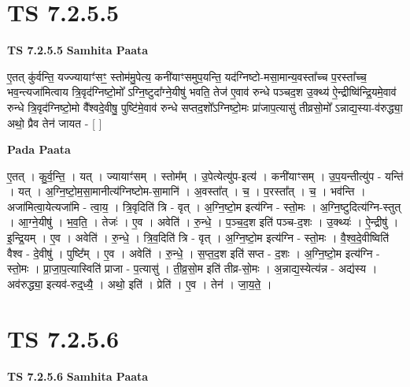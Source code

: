 \documentclass[17pt]{extarticle}
\begin{document}

\section{ TS 7.2.5.5 }

\textbf{TS 7.2.5.5 } \newline
\textbf{Samhita Paata} \newline

ए॒तत् कु॑र्वन्ति॒ यज्ज्यायाꣳ॑सꣳ॒॒ स्तोम॑मु॒पेत्य॒ कनी॑याꣳसमुप॒यन्ति॒ यद॑ग्निष्टो-मसा॒मान्य॒वस्ता᳚च्च प॒रस्ता᳚च्च॒ भव॒न्त्यजा॑मित्वाय त्रि॒वृद॑ग्निष्टो॒मो᳚ ऽग्नि॒ष्टुदा᳚ग्ने॒यीषु॑ भवति॒ तेज॑ ए॒वाव॑ रुन्धे पञ्चद॒श उ॒क्थ्य॑ ऐ॒न्द्रीष्वि॑न्द्रि॒यमे॒वाव॑ रुन्धे त्रि॒वृद॑ग्निष्टो॒मो वै᳚श्वदे॒वीषु॒ पुष्टि॑मे॒वाव॑ रुन्धे सप्तद॒शो᳚ऽग्निष्टो॒मः प्रा॑जाप॒त्यासु॑ तीव्रसो॒मो᳚ ऽन्नाद्य॒स्या-व॑रुद्ध्या॒ अथो॒ प्रैव तेन॑ जायत - [  ] \newline

\textbf{Pada Paata} \newline

ए॒तत् । कु॒र्व॒न्ति॒ । यत् । ज्यायाꣳ॑सम् । स्तोम᳚म् । उ॒पेत्येत्यु॑प-इत्य॑ । कनी॑याꣳसम् । उ॒प॒यन्तीत्यु॑प - यन्ति॑ । यत् । अ॒ग्नि॒ष्टो॒म॒सा॒मानीत्य॑ग्निष्टोम-सा॒मानि॑ । अ॒वस्ता᳚त् । च॒ । प॒रस्ता᳚त् । च॒ । भव॑न्ति । अजा॑मित्वा॒येत्यजा॑मि - त्वा॒य॒ । त्रि॒वृदिति॑ त्रि - वृत् । अ॒ग्नि॒ष्टो॒म इत्य॑ग्नि - स्तो॒मः । अ॒ग्नि॒ष्टुदित्य॑ग्नि-स्तुत् । आ॒ग्ने॒यीषु॑ । भ॒व॒ति॒ । तेजः॑ । ए॒व । अवेति॑ । रु॒न्धे॒ । प॒ञ्च॒द॒श इति॑ पञ्च-द॒शः । उ॒क्थ्यः॑ । ऐ॒न्द्रीषु॑ । इ॒न्द्रि॒यम् । ए॒व । अवेति॑ । रु॒न्धे॒ । त्रि॒व॒दिति॑ त्रि - वृत् । अ॒ग्नि॒ष्टो॒म इत्य॑ग्नि - स्तो॒मः । वै॒श्व॒दे॒वीष्विति॑ वैश्व - दे॒वीषु॑ । पुष्टि᳚म् । ए॒व । अवेति॑ । रु॒न्धे॒ । स॒प्त॒द॒श इति॑ सप्त - द॒शः । अ॒ग्नि॒ष्टो॒म इत्य॑ग्नि - स्तो॒मः । प्रा॒जा॒प॒त्यास्विति॑ प्राजा - प॒त्यासु॑ । ती॒व्र॒सो॒म इति॑ तीव्र-सो॒मः । अ॒न्नाद्य॒स्येत्य॑न्न - अद्य॑स्य । अव॑रुद्ध्या॒ इत्यव॑-रुद्॒ध्यै॒ । अथो॒ इति॑ । प्रेति॑ । ए॒व । तेन॑ । जा॒य॒ते॒ ।  \newline





\section{ TS 7.2.5.6 }

\textbf{TS 7.2.5.6 } \newline
\textbf{Samhita Paata} \newline
\end{document}
